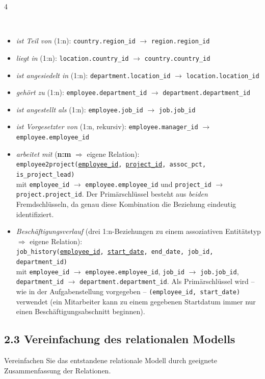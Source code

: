\documentclass[8pt,a4paper]{extarticle}
\newenvironment{loesung}[1][]{%
    \par\noindent{\bfseries\color{loesungrahmen}\small$\blacktriangleright$~L\"osung#1:}~%
}{\par\smallskip}
\newcommand{\pk}[1]{\underline{#1}}
\begin{document}
\begin{multicols}{4}
\begin{loesung}
\begin{itemize}
\item \emph{ist Teil von} (1:n): \texttt{country.region\_id} $\to$ \texttt{region.region\_id}
\item \emph{liegt in} (1:n): \texttt{location.country\_id} $\to$ \texttt{country.country\_id}
\item \emph{ist angesiedelt in} (1:n): \texttt{department.location\_id} $\to$ \texttt{location.location\_id}
\item \emph{geh\"ort zu} (1:n): \texttt{employee.department\_id} $\to$ \texttt{department.department\_id}
\item \emph{ist angestellt als} (1:n): \texttt{employee.job\_id} $\to$ \texttt{job.job\_id}
\item \emph{ist Vorgesetzter von} (1:n, rekursiv): \texttt{employee.manager\_id} $\to$ \texttt{employee.employee\_id}
\item \emph{arbeitet mit} (\textbf{n:m} $\Rightarrow$ eigene Relation): \\
\texttt{employee2project(\pk{employee\_id}, \pk{project\_id}, assoc\_pct, is\_project\_lead)} \\
mit \texttt{employee\_id} $\to$ \texttt{employee.employee\_id} und \texttt{project\_id} $\to$ \texttt{project.project\_id}. Der Prim\"arschl\"ussel besteht aus \emph{beiden} Fremdschl\"usseln, da genau diese Kombination die Beziehung eindeutig identifiziert.
\item \emph{Besch\"aftigungsverlauf} (drei 1:n-Beziehungen zu einem assoziativen Entit\"atstyp $\Rightarrow$ eigene Relation): \\
\texttt{job\_history(\pk{employee\_id}, \pk{start\_date}, end\_date, job\_id, department\_id)} \\
mit \texttt{employee\_id} $\to$ \texttt{employee.employee\_id}, \texttt{job\_id} $\to$ \texttt{job.job\_id}, \texttt{department\_id} $\to$ \texttt{department.department\_id}. Als Prim\"arschl\"ussel wird -- wie in der Aufgabenstellung vorgegeben -- \texttt{(employee\_id, start\_date)} verwendet (ein Mitarbeiter kann zu einem gegebenen Startdatum immer nur einen Besch\"aftigungsabschnitt beginnen).
\end{itemize}
\end{loesung}

\subsection*{2.3 \quad Vereinfachung des relationalen Modells}
Vereinfachen Sie das entstandene relationale Modell durch geeignete Zusammenfassung der Relationen.


\end{multicols}
\end{document}
